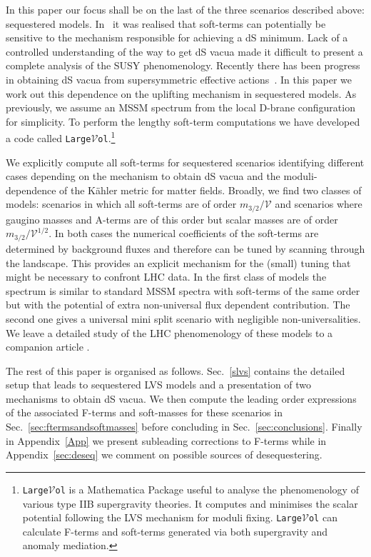 \documentclass[11pt,a4paper]{article}
\newcommand\vo{{\mathcal{V}}}
\begin{document}
In this paper our focus shall be on the last of the three scenarios described above: sequestered models.
In~\cite{Blumenhagen:2009gk} it was realised that soft-terms
can potentially be sensitive to the mechanism responsible for achieving a dS minimum.
Lack of a controlled understanding of the way to get dS vacua made it difficult to present a complete analysis of the SUSY phenomenology.
Recently there has been progress in obtaining dS vacua from supersymmetric effective actions~\cite{Cicoli:2012fh,Cicoli:2012vw,Cicoli:2013mpa,Cicoli:2013cha,Krippendorf:2009zza}. In this paper we work out this dependence on the uplifting mechanism in sequestered models. As previously, we assume an MSSM spectrum from the local D-brane configuration for simplicity.
To perform the lengthy soft-term computations we have developed a code called \texttt{Large$\mathcal{V}$ol}.\footnote{\texttt{Large$\mathcal{V}$ol} is
a Mathematica Package useful to analyse the phenomenology of various type IIB supergravity theories.
It computes and minimises the scalar potential following the LVS mechanism for moduli fixing.
\texttt{Large$\vo$ol} can calculate F-terms and soft-terms generated via both supergravity and anomaly mediation.}

We explicitly compute all soft-terms for sequestered scenarios
identifying different cases depending on the mechanism to obtain dS vacua and the moduli-dependence of
the K\"ahler metric for matter fields.
Broadly, we find two classes of models: scenarios in which all soft-terms are of order $m_{3/2}/\vo$
and scenarios where gaugino masses and A-terms are of this order but scalar masses are of order $m_{3/2}/\vo^{1/2}$.
In both cases the numerical coefficients of the soft-terms are determined by background fluxes and therefore can be tuned by scanning through the landscape.
This provides an explicit mechanism for the (small) tuning that might be necessary to confront LHC data.
In the first class of models the spectrum is similar to standard MSSM spectra with soft-terms of the same order but with the potential of extra non-universal flux dependent contribution.
The second one gives a universal mini split scenario with negligible non-universalities. We leave a detailed study of the LHC phenomenology of these models to a companion article \cite{us}.

The rest of this paper is organised as follows. Sec.~\ref{slvs} contains the detailed setup that leads to sequestered LVS models and a presentation of two mechanisms to obtain dS vacua. We then compute the leading order expressions of the associated F-terms and soft-masses for these scenarios in Sec.~\ref{sec:ftermsandsoftmasses} before concluding in Sec.~\ref{sec:conclusions}. Finally in Appendix~\ref{App} we present subleading corrections to F-terms while in Appendix~\ref{sec:deseq} we comment on possible sources of desequestering.
\end{document}
